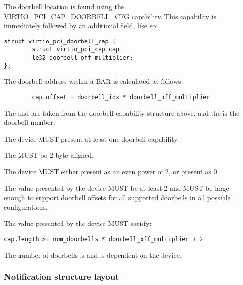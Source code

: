 The doorbell location is found using the VIRTIO_PCI_CAP_DOORBELL_CFG
capability.  This capability is immediately followed by an additional
field, like so:

\begin{lstlisting}
struct virtio_pci_doorbell_cap {
        struct virtio_pci_cap cap;
        le32 doorbell_off_multiplier;
};
\end{lstlisting}

The doorbell address within a BAR is calculated as follows:

\begin{lstlisting}
        cap.offset + doorbell_idx * doorbell_off_multiplier
\end{lstlisting}

The  and  are taken from the
doorbell capability structure above, and the  is the
doorbell number.

The device MUST present at least one doorbell capability.

The  MUST be 2-byte aligned.

The device MUST either present  as an even power of 2,
or present  as 0.

The value  presented by the device MUST be at least 2
and MUST be large enough to support doorbell offsets for all supported
doorbells in all possible configurations.

The value  presented by the device MUST satisfy:
\begin{lstlisting}
cap.length >= num_doorbells * doorbell_off_multiplier + 2
\end{lstlisting}

The number of doorbells is  and is dependent on the
device.

\subsubsection{Notification structure layout}\label{sec:Device Types / Vhost-user Device Backend / Additional Device Resources over PCI / Notification capability}

